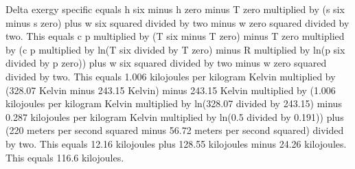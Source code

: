 Delta exergy specific equals h six minus h zero minus T zero multiplied by (s six minus s zero) plus w six squared divided by two minus w zero squared divided by two.  
This equals c p multiplied by (T six minus T zero) minus T zero multiplied by (c p multiplied by ln(T six divided by T zero) minus R multiplied by ln(p six divided by p zero)) plus w six squared divided by two minus w zero squared divided by two.  
This equals 1.006 kilojoules per kilogram Kelvin multiplied by (328.07 Kelvin minus 243.15 Kelvin) minus 243.15 Kelvin multiplied by (1.006 kilojoules per kilogram Kelvin multiplied by ln(328.07 divided by 243.15) minus 0.287 kilojoules per kilogram Kelvin multiplied by ln(0.5 divided by 0.191)) plus (220 meters per second squared minus 56.72 meters per second squared) divided by two.  
This equals 12.16 kilojoules plus 128.55 kilojoules minus 24.26 kilojoules.  
This equals 116.6 kilojoules.